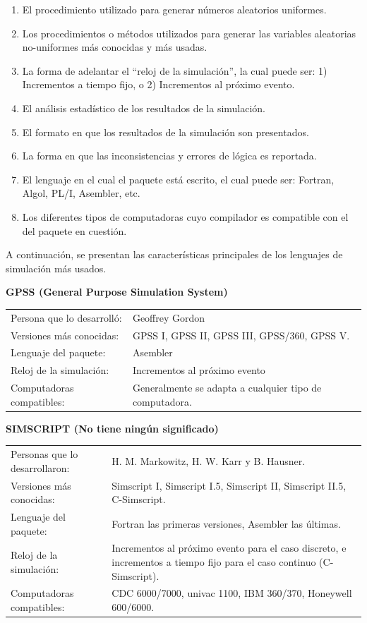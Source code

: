 \documentclass[11pt,letterpaper]{report}
\begin{document}
\begin{enumerate}[label=\alph*)]
\item El procedimiento utilizado para generar números aleatorios
uniformes.
\item Los procedimientos o métodos utilizados para generar las
variables aleatorias no-uniformes más conocidas y más usadas.
\item La forma de adelantar el ``reloj de la simulación'', la cual
puede ser: 1) Incrementos a tiempo fijo, o 2) Incrementos al próximo
evento.
\item El análisis estadístico de los resultados de la simulación.
\item El formato en que los resultados de la simulación son
presentados.
\item La forma en que las inconsistencias y errores de lógica es
reportada.
\item El lenguaje en el cual el paquete está escrito, el cual puede
ser: Fortran, Algol, PL/I, Asembler, etc.
\item Los diferentes tipos de computadoras cuyo compilador es
compatible con el del paquete en cuestión.
\end{enumerate}

A continuación, se presentan las características principales de los
lenguajes de simulación más usados.

\medskip
\noindent\textbf{GPSS (General Purpose Simulation System)}

\begin{table}[H]
\centering
\begin{tabular}{ll}
Persona que lo desarrolló: & Geoffrey Gordon \\
Versiones más conocidas: & GPSS I, GPSS II, GPSS III, GPSS/360, GPSS V. \\
Lenguaje del paquete: & Asembler \\
Reloj de la simulación: & Incrementos al próximo evento \\
Computadoras compatibles: & Generalmente se adapta a cualquier tipo de computadora. \\
\end{tabular}
\end{table}

\noindent\textbf{SIMSCRIPT (No tiene ningún significado)}

\begin{table}[H]
\centering
\begin{tabular}{ll}
Personas que lo desarrollaron: & H. M. Markowitz, H. W. Karr y B. Hausner. \\
Versiones más conocidas: & Simscript I, Simscript I.5, Simscript II, Simscript II.5, C-Simscript. \\
Lenguaje del paquete: & Fortran las primeras versiones, Asembler las últimas. \\
Reloj de la simulación: & Incrementos al próximo evento para el caso discreto, e incrementos a tiempo fijo para el caso continuo (C-Simscript). \\
Computadoras compatibles: & CDC 6000/7000, univac 1100, IBM 360/370, Honeywell 600/6000. \\
\end{tabular}
\end{table}
\end{document}
